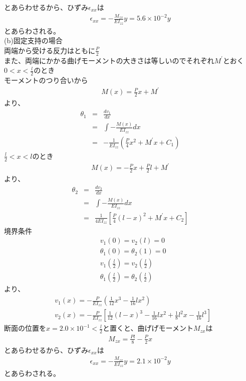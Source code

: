 \documentclass[pdflatex,ja=standard,fleqn]{bxjsarticle}
\begin{document}
とあらわせるから、ひずみ$\epsilon_{xx}$は
\begin{eqnarray}
    \epsilon_{xx}=-\frac{M_{zx}}{EI_{zz}}y=5.6×10^{-2}y
\end{eqnarray}
とあらわされる。\\
(b)固定支持の場合\\
両端から受ける反力はともに$\frac{P}{2}$\\
また、両端にかかる曲げモーメントの大きさは等しいのでそれぞれ$M^{\prime}$とおく\\
$0<x<\frac{l}{2}$のとき\\
モーメントのつり合いから
\begin{eqnarray}
    M(x)=\frac{P}{2}x+M^{\prime}
\end{eqnarray}
より、
\begin{eqnarray}
    \theta_{1}&=&\frac{dv_{1}}{dx}\\
    &=&\int -\frac{M(x)}{EI_{zz}}dx\\
    &=&-\frac{1}{EI_{zz}}\left(\frac{P}{4}x^{2}+M^{\prime}x+C_{1}\right)
\end{eqnarray}
$\frac{l}{2}<x<l$のとき
\begin{eqnarray}
    M(x)=-\frac{P}{2}x+\frac{P}{2}l+M^{\prime}
\end{eqnarray}
より、
\begin{eqnarray}
    \theta_{2}&=&\frac{dv_{2}}{dx}\\
    &=&\int -\frac{M(x)}{EI_{zz}}dx\\
    &=&\frac{1}{4EI_{zz}}\left[\frac{P}{4}(l-x)^{2}+M^{\prime}x+C_{2}\right]
\end{eqnarray}
境界条件
\begin{align}
    &v_{1}(0)=v_{2}(l)=0\\
    &\theta_{1}(0)=\theta_{2}(1)=0\\
    &v_{1}\left(\frac{l}{2}\right)=v_{2}\left(\frac{l}{2}\right)\\
    &\theta_{1}\left(\frac{l}{2}\right)=\theta_{2}\left(\frac{l}{2}\right)
\end{align}
より、
\begin{align}
    &v_{1}(x)=-\frac{P}{EI_{zz}}\left(\frac{1}{12}x^{3}-\frac{1}{16}lx^{2}\right)\\
    &v_{2}(x)=-\frac{P}{EI_{zz}}\left[\frac{1}{12}(l-x)^{3}-\frac{1}{16}lx^{2}+\frac{1}{8}l^{2}x-\frac{1}{16}l^{3}\right]
\end{align}
断面の位置を$x=2.0×10^{-1}<\frac{l}{2}$と置くと、曲げげモーメント$M_{zx}$は
\begin{eqnarray}
    M_{zx}=\frac{Pl}{8}-\frac{P}{2}x
\end{eqnarray}
とあらわせるから、ひずみ$\epsilon_{xx}$は
\begin{eqnarray}
    \epsilon_{xx}=-\frac{M_{zx}}{EI_{zz}}y=2.1×10^{-2}y
\end{eqnarray}
とあらわされる。
\end{document}
